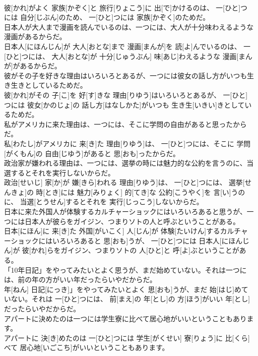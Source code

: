 \documentclass[8pt]{extreport}
\begin{document}
\begin{CJK}{UTF8}{min}
\\	彼[かれ]がよく 家族[かぞく]と 旅行[りょこう]に 出[で]かけるのは、 一[ひと]つには 自分[じぶん]のため、 一[ひと]つには 家族[かぞく]のためだ。
\\	日本人が大人まで漫画を読んでいるのは、一つには、大人が十分味わえるような漫画があるからだ。	
\\	日本人[にほんじん]が 大人[おとな]まで 漫画[まんが]を 読[よ]んでいるのは、 一[ひと]つには、 大人[おとな]が 十分[じゅうぶん] 味[あじ]わえるような 漫画[まんが]があるからだ。
\\	彼がその子を好きな理由はいろいろとあるが、一つには彼女の話し方がいつも生き生きとしているためだ。	
\\	彼[かれ]がその 子[こ]を 好[す]きな 理由[りゆう]はいろいろとあるが、 一[ひと]つには 彼女[かのじょ]の 話し方[はなしかた]がいつも 生き生[いきい]きとしているためだ。
\\	私がアメリカに来た理由は、一つには、そこに学問の自由があると思ったからだ。	
\\	私[わたし]がアメリカに 来[き]た 理由[りゆう]は、 一[ひと]つには、そこに 学問[がくもん]の 自由[じゆう]があると 思[おも]ったからだ。
\\	政治家が嫌われる理由は、一つには、選挙の時には魅力的な公約を言うのに、当選するとそれを実行しないからだ。	
\\	政治[せいじ] 家[か]が 嫌[きら]われる 理由[りゆう]は、 一[ひと]つには、 選挙[せんきょ]の 時[とき]には 魅力[みりょく] 的[てき]な 公約[こうやく]を 言[い]うのに、 当選[とうせん]するとそれを 実行[じっこう]しないからだ。
\\	日本に来た外国人が体験するカルチャーショックにはいろいろあると思うが、一つには日本人が彼らをガイジン、つまりソトの人と呼ぶということがある。	
\\	日本[にほん]に 来[き]た 外国[がいこく] 人[じん]が 体験[たいけん]するカルチャーショックにはいろいろあると 思[おも]うが、 一[ひと]つには 日本人[にほんじん]が 彼[かれ]らをガイジン、つまりソトの 人[ひと]と 呼[よ]ぶということがある。
\\	「10年日記」をやってみたいとよく思うが、まだ始めていない。それは一つには、前の年の方がいい年だったらいやだからだ。	
\\	年[ねん] 日記[にっき]」をやってみたいとよく 思[おも]うが、まだ 始[はじ]めていない。それは 一[ひと]つには、 前[まえ]の 年[とし]の 方[ほう]がいい 年[とし]だったらいやだからだ。
\\	アパートに決めたのは一つには学生寮に比べて居心地がいいということもあります。	
\\	アパートに 決[き]めたのは 一[ひと]つには 学生[がくせい] 寮[りょう]に 比[くら]べて 居心地[いごこち]がいいということもあります。

\end{CJK}
\end{document}

